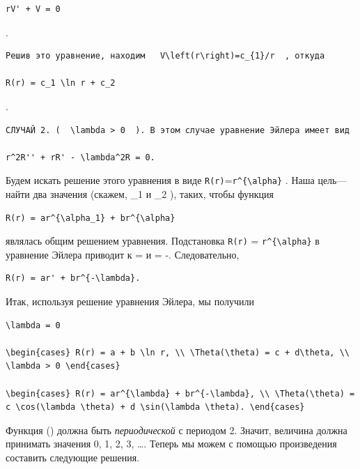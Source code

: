\documentclass[
  ukrainian,
]{article}
\begin{document}
\begin{verbatim}
rV' + V = 0
\end{verbatim}

.

\begin{verbatim}
Решив это уравнение, находим   V\left(r\right)=c_{1}/r  , откуда

R(r) = c_1 \ln r + c_2
\end{verbatim}

.

\begin{verbatim}
СЛУЧАЙ 2. (  \lambda > 0  ). В этом случае уравнение Эйлера имеет вид

r^2R'' + rR' - \lambda^2R = 0.
\end{verbatim}

Будем искать решение этого уравнения в виде
\texttt{R(r)}=\texttt{r\^{}\{\textbackslash{}alpha\}} . Наша
цель---найти два значения \alpha   (скажем, \alpha\_1 и \alpha\_2 ),
таких, чтобы функция

\begin{verbatim}
R(r) = ar^{\alpha_1} + br^{\alpha}
\end{verbatim}

являлась общим решением уравнения. Подстановка \texttt{R(r)} =
\texttt{r\^{}\{\textbackslash{}alpha\}} в уравнение Эйлера приводит к
\alpha = \lambda   и \alpha = -\lambda  . Следовательно,

\begin{verbatim}
R(r) = ar' + br^{-\lambda}.
\end{verbatim}

Итак, используя решение уравнения Эйлера, мы получили

\begin{verbatim}
\lambda = 0

\begin{cases} R(r) = a + b \ln r, \\ \Theta(\theta) = c + d\theta, \\ \lambda > 0 \end{cases}

\begin{cases} R(r) = ar^{\lambda} + br^{-\lambda}, \\ \Theta(\theta) = c \cos(\lambda \theta) + d \sin(\lambda \theta). \end{cases}
\end{verbatim}

Функция \Theta(\theta) должна быть \emph{периодической} с периодом
2\pi . Значит, величина \lambda  должна принимать значения 0, 1, 2, 3,
\ldots . Теперь мы можем с помощью произведения составить следующие
решения.
\end{document}
